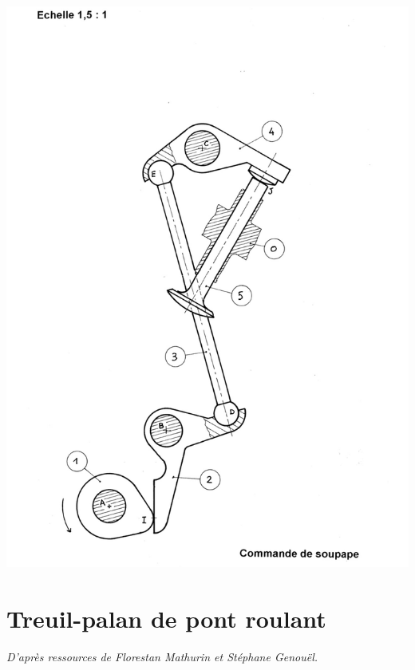 \documentclass[10pt,fleqn]{article} %
\begin{document}
\newpage
\begin{center}
\includegraphics[width=\textwidth]{images/soupape_A3}
\end{center}


\newpage 
\section{Treuil-palan de pont roulant}
\begin{flushright}
\textit{D'après ressources de Florestan Mathurin et Stéphane Genouël.}
\end{flushright}
\setcounter{exo}{0}
 \renewcommand{\baselinestretch}{1.2}
\end{document}
